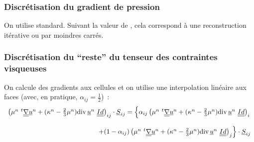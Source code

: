 \subsubsection*{Discr\'etisation du gradient de pression}

On utilise  standard. Suivant la valeur de ,
cela correspond à une reconstruction itérative ou par moindres carrés.

\subsubsection*{Discr\'etisation du ``reste'' du tenseur des contraintes visqueuses}

On calcule des gradients aux cellules et on utilise une
interpolation lin\'eaire aux
faces (avec, en pratique, $\alpha_{ij}=\frac{1}{2}$)~:
\begin{equation}
\begin{array}{r}
\left(\mu^n\ ^t\gradt{\vect{u}^n} + (\kappa^n-\frac{2}{3}\mu^n)
\divs{\vect{u}^n}\ \tens{Id}\right)_{ij}\cdot\vect{S}_{ij}
= \left\{\alpha_{ij} \left(\mu^n\ ^t\gradt{\vect{u}^n}
+ (\kappa^n-\frac{2}{3}\mu^n)\divs{\vect{u}^n}\ \tens{Id}\right)_i\right.\\
\\
\left.+ (1-\alpha_{ij}) \left(\mu^n\ ^t\gradt{\vect{u}^n}
+ (\kappa^n-\frac{2}{3}\mu^n)\divs{\vect{u}^n}\ \tens{Id}\right)_j
\right\} \cdot\vect{S}_{ij}\\
\end{array}
\end{equation}

